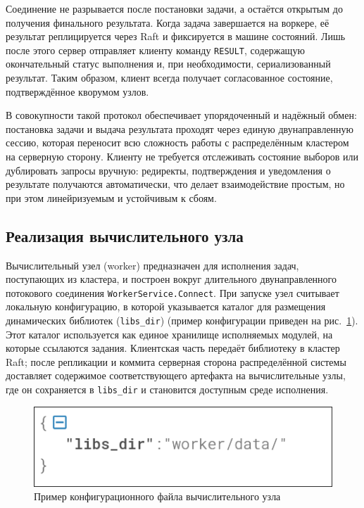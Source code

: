 Соединение не разрывается после постановки задачи, а остаётся открытым до
получения финального результата. Когда задача завершается на воркере, её
результат реплицируется через Raft и фиксируется в машине состояний. Лишь
после этого сервер отправляет клиенту команду \texttt{RESULT}, содержащую
окончательный статус выполнения и, при необходимости, сериализованный результат.
Таким образом, клиент всегда получает согласованное состояние, подтверждённое
кворумом узлов.

В совокупности такой протокол обеспечивает упорядоченный и надёжный обмен:
постановка задачи и выдача результата проходят через единую двунаправленную
сессию, которая переносит всю сложность работы с распределённым кластером на
серверную сторону. Клиенту не требуется отслеживать состояние выборов или
дублировать запросы вручную: редиректы, подтверждения и уведомления о результате
получаются автоматически, что делает взаимодействие простым, но при этом
линейризуемым и устойчивым к сбоям.

\subsection{Реализация вычислительного узла}

Вычислительный узел (worker) предназначен для исполнения задач, поступающих из
кластера, и построен вокруг длительного двунаправленного потокового соединения
\texttt{WorkerService.Connect}. При запуске узел считывает локальную
конфигурацию, в которой указывается каталог для размещения динамических
библиотек (\texttt{libs\_dir}) (пример конфигурации приведен на
рис.~\ref{fig:worker_config}). Этот каталог используется как единое хранилище
исполняемых модулей, на которые ссылаются задания. Клиентская часть передаёт
библиотеку в кластер Raft; после репликации и коммита серверная сторона
распределённой системы доставляет содержимое соответствующего артефакта на
вычислительные узлы, где он сохраняется в \texttt{libs\_dir} и становится
доступным среде исполнения.

\begin{figure}
  \centering
  \includegraphics[scale=0.4]{inc/worker-config.png}
  \caption{Пример конфигурационного файла вычислительного узла}
  \label{fig:worker_config}
\end{figure}

